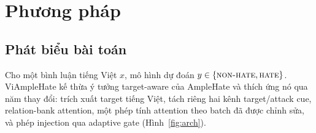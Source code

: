 \documentclass[11pt]{article}
\begin{document}
\section{Phương pháp}

\subsection{Phát biểu bài toán}
Cho một bình luận tiếng Việt $x$, mô hình dự đoán $y \in \{\textsc{non-hate}, \textsc{hate}\}$. ViAmpleHate kế thừa ý tưởng target-aware của AmpleHate và thích ứng nó qua năm thay đổi: trích xuất target tiếng Việt, tách riêng hai kênh target/attack cue, relation-bank attention, một phép tính attention theo batch đã được chỉnh sửa, và phép injection qua adaptive gate (Hình~\ref{fig:arch}).

\end{document}
